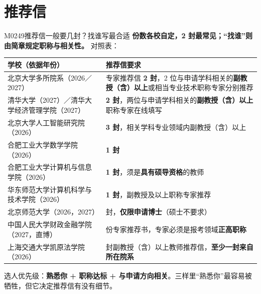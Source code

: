 \section{推荐信}
\begin{qa}{M0249}{推荐信一般要几封？找谁写最合适}
\textbf{份数各校自定，2 封最常见；“找谁”则由简章规定职称与相关性。} 对照表：

\par\vspace{2pt}\nobreak\begin{center}\footnotesize
\begin{tabularx}{\textwidth}{>{\raggedright\arraybackslash}X>{\raggedright\arraybackslash}X}
\toprule
\textbf{学校（依据年份）} & \textbf{推荐信要求} \\ \midrule
北京大学多所院系（2026／2027） & 专家推荐信 \textbf{2 封}，2 位与申请学科相关的\textbf{副教授（含）以上}或相当专业技术职称专家分别推荐 \\
清华大学（2027）／清华大学经济管理学院（2027） & \textbf{2 封}，两位与申请学科相关的\textbf{副教授（含）以上}职称专家在线填写 \\
北京大学人工智能研究院（2026） & \textbf{3 封}，相关学科专业领域内副教授（含）以上 \\
合肥工业大学数学学院（2026） & \textbf{1 封} \\
合肥工业大学计算机与信息学院（2026） & \textbf{1 封}，须是\textbf{具有硕导资格}的教师 \\
华东师范大学计算机科学与技术学院（2026） & \textbf{1 封}，副教授及以上职称专家推荐 \\
北京师范大学（2026，2027） & 2 封，\textbf{仅限申请博士}（硕士不要求） \\
中国人民大学财政金融学院（2027，直博） & 2 份专家推荐书，专家必须是报考领域\textbf{正高职称} \\
上海交通大学凯原法学院（2026） & 2 封副教授（含）以上教师推荐信，\textbf{至少一封来自所在院系} \\
\bottomrule
\end{tabularx}
\end{center}\vspace{2pt}\par

选人优先级：\textbf{熟悉你 + 职称达标 + 与申请方向相关}。三样里“熟悉你”最容易被牺牲，但它决定推荐信有没有细节。
\end{qa}

